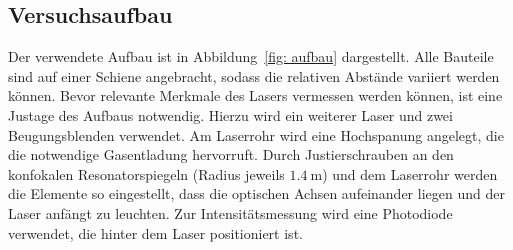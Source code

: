 \subsection{Versuchsaufbau}
\label{sec:Versuchsaufbau}

Der verwendete Aufbau ist in Abbildung~\ref{fig: aufbau} dargestellt. Alle Bauteile sind auf einer Schiene angebracht, sodass die
relativen Abstände variiert werden können. Bevor relevante Merkmale des Lasers vermessen werden können, ist eine
Justage des Aufbaus notwendig. Hierzu wird ein weiterer Laser und zwei Beugungsblenden verwendet. Am Laserrohr wird eine Hochspanung
angelegt, die die notwendige Gasentladung hervorruft. Durch Justierschrauben an den konfokalen Resonatorspiegeln (Radius jeweils $\SI{1.4}{\meter}$)
und dem Laserrohr werden die Elemente so eingestellt, dass die optischen Achsen aufeinander liegen und der Laser anfängt zu leuchten.
Zur Intensitätsmessung wird eine Photodiode verwendet, die hinter dem Laser positioniert ist.
